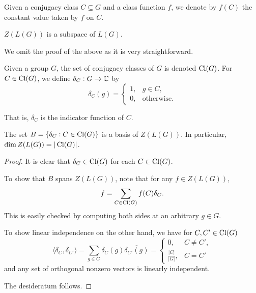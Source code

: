 		Given a conjugacy class $C \subseteq G$ and a class function $f$, we denote by $f(C)$ the constant value taken by $f$ on $C$.

		\begin{prop}
			$Z(L(G))$ is a subspace of $L(G)$.
		\end{prop}
		We omit the proof of the above as it is very straightforward.

		\begin{fdef}
			Given a group $G$, the set of conjugacy classes of $G$ is denoted $\operatorname{Cl}(G)$. For $C \in \operatorname{Cl}(G)$, we define $\delta_C : G \to \mathbb{C}$ by
			\[ \delta_C(g) = \begin{cases} 1, & g \in C, \\ 0, & \text{otherwise.} \end{cases} \]
		\end{fdef}

		That is, $\delta_C$ is the indicator function of $C$.

		\begin{fprop}
			\label{prop: dim ZLG}
			The set $B = \{ \delta_C : C \in \operatorname{Cl}(G) \}$ is a basis of $Z(L(G))$. In particular, $\dim Z(L(G)) = |\operatorname{Cl}(G)|$.
		\end{fprop}
		\begin{proof}
			It is clear that $\delta_C \in \operatorname{Cl}(G)$ for each $C \in \operatorname{Cl}(G)$.

			To show that $B$ spans $Z(L(G))$, note that for any $f \in Z(L(G))$,
			\[ f = \sum_{C \in \operatorname{Cl}(G)} f(C) \delta_C. \]
			This is easily checked by computing both sides at an arbitrary $g \in G$.

			To show linear independence on the other hand, we have for $C,C' \in \operatorname{Cl}(G)$
			\[ \langle \delta_C , \delta_{C'} \rangle = \sum_{g \in G} \delta_C(g) \overline{\delta_{C'}(g)} = \begin{cases} 0 , & C \ne C', \\ \frac{|C|}{|G|}, & C = C' \end{cases} \]
			and any set of orthogonal nonzero vectors is linearly independent.

			The desideratum follows.
		\end{proof}

